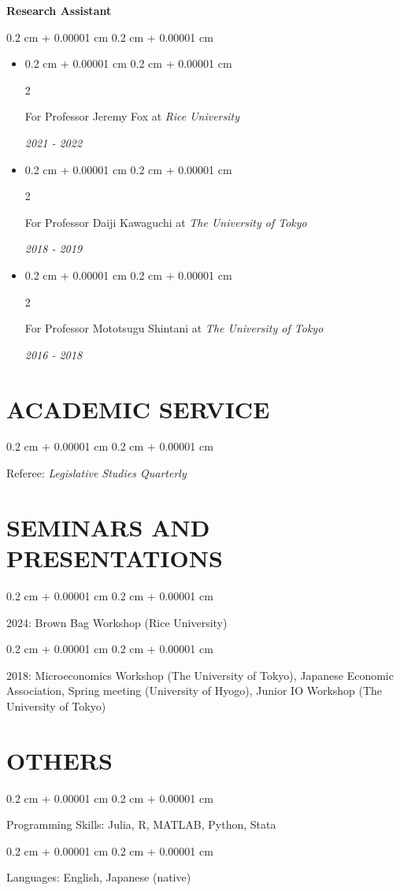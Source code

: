 \documentclass[10pt, letterpaper]{article}
\newenvironment{highlights}{
    \begin{itemize}[
        topsep=0.10 cm,
        parsep=0.10 cm,
        partopsep=0pt,
        itemsep=0.0 cm,
        leftmargin=0.4 cm + 10pt
    ]
}{
    \end{itemize}
} %
\newenvironment{onecolentry}{
    \begin{adjustwidth}{
        0.2 cm + 0.00001 cm
    }{
        0.2 cm + 0.00001 cm
    }
}{
    \end{adjustwidth}
} %
\newenvironment{twocolentry}[2][]{
    \onecolentry
    \def\secondColumn{#2}
    \setcolumnwidth{\fill, 4.5 cm}
    \begin{paracol}{2}
}{
    \switchcolumn \raggedleft \secondColumn
    \end{paracol}
    \endonecolentry
} %
\begin{document}
    \textbf{Research Assistant}
    \vspace{0.10 cm}
    \begin{onecolentry}
        \begin{highlights}
            \item \begin{twocolentry}{
                \textit{2021 - 2022}}
                For Professor Jeremy Fox at \textit{Rice University}
            \end{twocolentry}
            \item \begin{twocolentry}{
                \textit{2018 - 2019}}
                For Professor Daiji Kawaguchi at \textit{The University of Tokyo}
            \end{twocolentry}
            \item \begin{twocolentry}{
                \textit{2016 - 2018}}
                For Professor Mototsugu Shintani at \textit{The University of Tokyo}
            \end{twocolentry}
        \end{highlights}
    \end{onecolentry}

    \section{ACADEMIC SERVICE}
    \begin{onecolentry}
        Referee: \textit{Legislative Studies Quarterly}
    \end{onecolentry}

    \section{SEMINARS AND PRESENTATIONS}
    \begin{onecolentry}
        2024: Brown Bag Workshop (Rice University)
    \end{onecolentry}
    \begin{onecolentry}
        2018: Microeconomics Workshop (The University of Tokyo), Japanese Economic Association, Spring meeting (University of Hyogo), Junior IO Workshop (The University of Tokyo)
    \end{onecolentry}

    \section{OTHERS}
    \begin{onecolentry}
        Programming Skills: Julia, R, MATLAB, Python, Stata
    \end{onecolentry}
    \begin{onecolentry}
        Languages: English, Japanese (native)
    \end{onecolentry}
\end{document}
